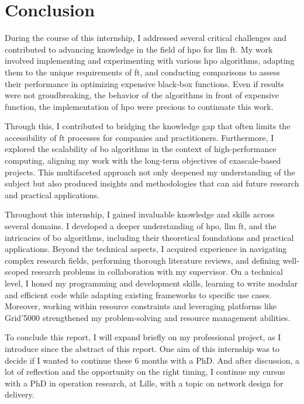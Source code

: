 \chapter*{Conclusion}
\label{chap:conclusion}

During the course of this internship, I addressed several critical challenges and contributed to advancing knowledge in the field of \acrlong{hpo} for \acrlong{llm} \gls{ft}. My work involved implementing and experimenting with various \acrlong{hpo} algorithms, adapting them to the unique requirements of \gls{ft}, and conducting comparisons to assess their performance in optimizing expensive black-box functions. Even if results were not groudbreaking, the behavior of the algorithms in front of expensive function, the implementation of \acrfull{hpo} were precious to continuate this work.

Through this, I contributed to bridging the knowledge gap that often limits the accessibility of \gls{ft} processes for companies and practitioners. Furthermore, I explored the scalability of \acrlong{bo} algorithms in the context of high-performance computing, aligning my work with the long-term objectives of exascale-based projects. This multifaceted approach not only deepened my understanding of the subject but also produced insights and methodologies that can aid future research and practical applications.


Throughout this internship, I gained invaluable knowledge and skills across several domains. I developed a deeper understanding of \acrlong{hpo}, \acrlong{llm} \gls{ft}, and the intricacies of \acrlong{bo} algorithms, including their theoretical foundations and practical applications. Beyond the technical aspects, I acquired experience in navigating complex research fields, performing thorough literature reviews, and defining well-scoped research problems in collaboration with my supervisor. On a technical level, I honed my programming and development skills, learning to write modular and efficient code while adapting existing frameworks to specific use cases. Moreover, working within resource constraints and leveraging platforms like Grid’5000 strengthened my problem-solving and resource management abilities. 

To conclude this report, I will expand briefly on my professional project, as I introduce since the abstract of this report. One aim of this internship was to decide if I wanted to continue these 6 months with a PhD. And after discussion, a lot of reflection and the opportunity on the right timing, I continue my cursus with a PhD in operation research, at Lille, with a topic on network design for delivery.


